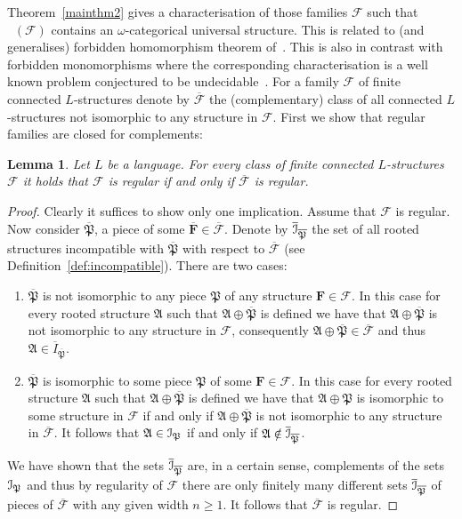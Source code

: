 \documentclass{elsarticle}
\def\Forb{\mathop{\mathrm{Forb_{he}}}\nolimits}
\def\str#1{\mathbf {#1}}
\def\F{{\mathcal F}}
\def\Piece{{\mathfrak P}}
\def\APiece{{\mathfrak A}}
\def\Incompatible{{\cal I}}
\theoremstyle{plain}
\newtheorem{lemma}[theorem]{Lemma}
\theoremstyle{definition}
\theoremstyle{remark}
\begin{document}
Theorem~\ref{mainthm2} gives a characterisation of those families $\F$ such that $\Forb(\F)$ contains
an $\omega$-categorical universal structure.
This is related to (and generalises) forbidden homomorphism theorem of~\cite{Cherlin1999}. This is also in contrast with forbidden monomorphisms where the corresponding characterisation is a well known problem conjectured to be undecidable~\cite{Cherlin2011}.
For a family $\F$ of finite connected $L$-structures denote by $\overline{\F}$ the (complementary) class
of all connected $L$-structures not isomorphic to any structure in
$\F$.  First we show that regular families are closed for complements:
\begin{lemma}
\label{doplnek}
Let $L$ be a language.
For every class of finite connected $L$-structures $\F$ it holds that $\F$ is regular if and only if $\overline{\F}$ is regular.
\end{lemma}
\begin{proof}
Clearly it suffices to show only one implication. Assume that $\F$ is regular.
Now consider $\overline{\Piece}$, a piece of some $\overline{\str{F}}\in
\overline{\F}$.  Denote by $\overline{\Incompatible}_{\overline{\Piece}}$ 
the set of all rooted structures incompatible with $\overline{\Piece}$ with
respect to $\overline{\F}$ (see Definition~\ref{def:incompatible}).  There are two cases:
\begin{enumerate}
\item $\overline{\Piece}$ is not isomorphic to any piece $\Piece$ of any structure $\str{F}\in \F$.
In this case for every rooted structure $\APiece$ such that $\APiece\oplus\overline{\Piece}$ is defined we have
that $\APiece\oplus\overline{\Piece}$ is not isomorphic to any structure in $\F$, consequently $\APiece\oplus\overline{\Piece}\in \overline{\F}$ and thus $\APiece \in \overline{I}_{\overline{\Piece}}$.
\item  $\overline{\Piece}$ is isomorphic to some piece $\Piece$ of some $\str{F}\in \F$.
In this case for every rooted structure $\APiece$ such that $\APiece\oplus\overline{\Piece}$ is defined we have that
$\APiece\oplus\Piece$ is isomorphic to some structure in $\F$ if and only if $\APiece\oplus\overline{\Piece}$ is
not isomorphic to any structure in $\overline{\F}$.  It follows that $\APiece\in \Incompatible_\Piece$ if and only if
$\APiece \notin \overline{\Incompatible}_{\overline{\Piece}}$.
\end{enumerate}
We have shown that the sets $\overline{\Incompatible}_{\overline{\Piece}}$ are,
in a certain sense, complements of the sets $\Incompatible_\Piece$ and thus by regularity of $\F$ there
are only finitely many different sets
$\overline{\Incompatible}_{\overline{\Piece}}$ of pieces of $\overline{\F}$ with any given width $n\geq 1$.
It follows that $\overline{\F}$ is regular.
\end{proof}
\end{document}
